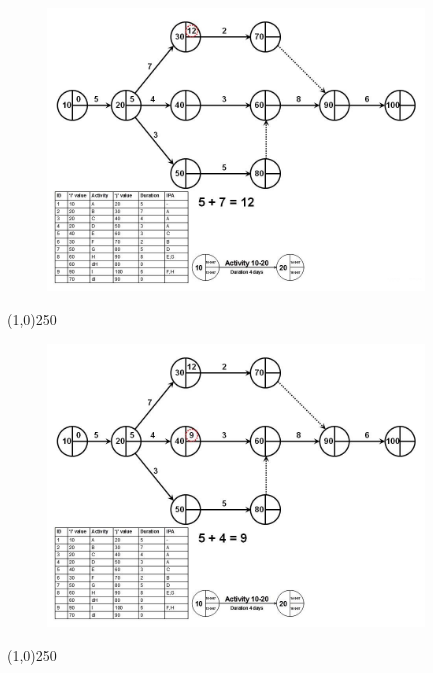 \begin{frame}
\begin{figure}
	\centering
		\includegraphics[width = 10.0cm]{oldnotes/Slide103.jpg}
\end{figure}
\end{frame}
\begin{center}\line(1,0){250}\end{center}


\begin{frame}
\begin{figure}
	\centering
		\includegraphics[width = 10.0cm]{oldnotes/Slide104.jpg}
\end{figure}
\end{frame}
\begin{center}\line(1,0){250}\end{center}


